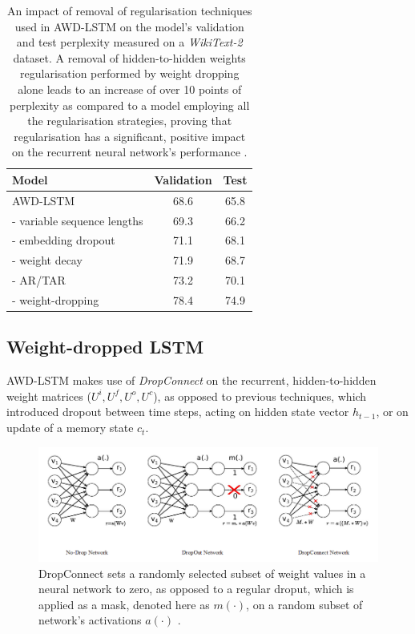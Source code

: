 \begin{table}[ht]
\centering
\begin{tabular}{ lcc }
\toprule
Model & Validation & Test \\ \midrule
AWD-LSTM & 68.6 & 65.8 \\ \midrule
- variable sequence lengths & 69.3 & 66.2 \\
- embedding dropout & 71.1 & 68.1 \\
- weight decay & 71.9 & 68.7 \\
- AR/TAR & 73.2 & 70.1 \\
- weight-dropping & 78.4 & 74.9 \\ 
\bottomrule
\end{tabular}
\caption{An impact of removal of regularisation techniques used in AWD-LSTM on the model's validation and test perplexity measured on a \emph{WikiText-2} dataset. A removal of hidden-to-hidden weights regularisation performed by weight dropping alone leads to an increase of over 10 points of perplexity as compared to a model employing all the regularisation strategies, proving that regularisation has a significant, positive impact on the recurrent neural network's performance \cite{merity:awdlstm}.}
\end{table}

\subsection{Weight-dropped LSTM}
\label{weightdropped}

AWD-LSTM makes use of \emph{DropConnect} on the recurrent, hidden-to-hidden weight matrices ($U^i, U^f, U^o, U^c$), as opposed to previous techniques, which introduced dropout between time steps, acting on hidden state vector $h_{t-1}$, or on update of a memory state $c_t$.

\begin{figure}[]
\centering
\includegraphics[scale=0.6]{figures/dropconnect.png}
\caption{DropConnect sets a randomly selected subset of weight values in a neural network to zero, as opposed to a regular droput, which is applied as a mask, denoted here as $m(\cdot)$, on a random subset of network's activations $a(\cdot)$ \cite{dropconnect}.}
\label{dropconnect}
\end{figure}

